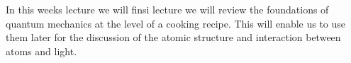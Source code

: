 In this weeks lecture we will finsi lecture we will review the foundations of quantum mechanics at the level of a cooking recipe. This will enable us to use them later for the discussion of the atomic structure and interaction between atoms and light.